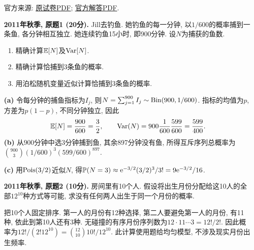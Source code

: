 \noindent 官方来源: \href{https://ocw.mit.edu/courses/18-600-probability-and-random-variables-fall-2019/1419e4cab0601d2723040c9b58427a79_MIT18_600F19_mid1_F2011.pdf}{原试卷PDF}; \href{https://ocw.mit.edu/courses/18-600-probability-and-random-variables-fall-2019/d82587d0909f829fb4b17d4e0b240ea3_MIT18_600F19_mid1_F2011_soln.pdf}{官方解答PDF}.
\begin{exercise}\label{ex:m1-2011f-q1}
\textbf{2011年秋季, 原题1 (20分).} Jill去钓鱼. 她钓鱼的每一分钟, 以$1/600$的概率捕到一条鱼, 各分钟相互独立. 她连续钓鱼15小时, 即900分钟. 设$N$为捕获的鱼数.
\begin{enumerate}\item[(a)]\label{ex:m1-2011f-q1-a} 精确计算$\mathbb E[N]$及$\operatorname{Var}[N]$.\item[(b)]\label{ex:m1-2011f-q1-b} 精确计算恰捕到3条鱼的概率.\item[(c)]\label{ex:m1-2011f-q1-c} 用泊松随机变量近似计算恰捕到3条鱼的概率.\end{enumerate}
\end{exercise}
\begin{solution}
\textbf{(a)}\label{sol:m1-2011f-q1-a} 令每分钟的捕鱼指标为$I_j$, 则$N=\sum_{j=1}^{900}I_j\sim\operatorname{Bin}(900,1/600)$. 指标的均值为$p$, 方差为$p(1-p)$, 不同分钟独立, 因此
\[
\mathbb E[N]=\frac{900}{600}=\frac32,\qquad
\operatorname{Var}(N)=900\frac1{600}\frac{599}{600}=\frac{599}{400}.
\]
\textbf{(b)}\label{sol:m1-2011f-q1-b} 从900分钟中选3分钟捕到鱼, 其余897分钟没有鱼, 所得互斥序列总概率为$\binom{900}{3}(1/600)^3(599/600)^{897}$.

\textbf{(c)}\label{sol:m1-2011f-q1-c} 用$\operatorname{Pois}(3/2)$近似$N$, 得$\mathbb P(N=3)\approx\mathrm e^{-3/2}(3/2)^3/3!=9\mathrm e^{-3/2}/16$.
\end{solution}

\begin{exercise}\label{ex:m1-2011f-q2}
\textbf{2011年秋季, 原题2 (10分).} 房间里有10个人. 假设将出生月份分配给这10人的全部$12^{10}$种方式等可能, 求没有任何两人出生于同一个月份的概率.
\end{exercise}
\begin{solution}
\label{sol:m1-2011f-q2}
把10个人固定排序. 第一人的月份有12种选择, 第二人要避免第一人的月份, 有11种, 依此到第10人还有3种. 无碰撞的有序月份序列数为$12\cdot11\cdots3=12!/2!$. 因此概率为$12!/(2!12^{10})=\binom{12}{10}10!/12^{10}$. 此计算使用题给均匀模型, 不涉及现实月份出生频率.
\end{solution}

